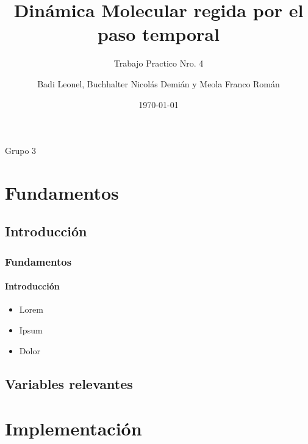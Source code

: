 \documentclass[hyperref={pdfpagelayout=SinglePage}]{beamer}
\title{Dinámica Molecular regida por el paso temporal}
\subtitle{Trabajo Practico Nro. 4}
\author{Badi Leonel, Buchhalter Nicolás Demián y Meola Franco Román}
\date{\today}
\begin{document}
\renewcommand{\figurename}{Grafico}

\begin{frame}[plain]
    \frametitle{} 
    \titlepage
    \centering
	Grupo 3
\end{frame}

\section{Fundamentos}

\subsection{Introducción}

\begin{frame}
\frametitle{Fundamentos}
\framesubtitle{Introducción}
\begin{itemize}
	\item Lorem
	\item Ipsum
	\item Dolor
\end{itemize}
\end{frame}

\subsection{Variables relevantes}


\section{Implementación}
\end{document}
